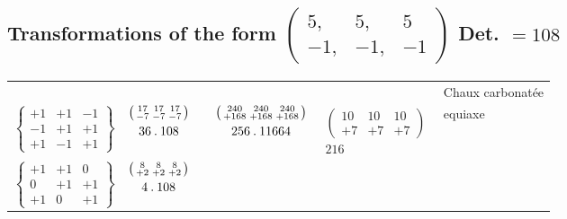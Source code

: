 \subsection*{Transformations of the form $\left(\begin{smallmatrix}5,&5,&5\\-1,&-1,&-1\end{smallmatrix}\right)$ Det. $=108$}
\begin{center}\scriptsize
\setlength{\tabcolsep}{2pt}
\begin{tabular}{ccccc l}
&&&&&Chaux carbonatée\\
$\left\{\begin{smallmatrix}+1&+1&-1\\-1&+1&+1\\+1&-1&+1\end{smallmatrix}\right\}$&
$\begin{gathered}\left(\begin{smallmatrix}17&17&17\\-7&-7&-7\end{smallmatrix}\right)\\36\mathbin{.}108\end{gathered}$&&
$\begin{gathered}\left(\begin{smallmatrix}240&240&240\\+168&+168&+168\end{smallmatrix}\right)\\256\mathbin{.}11664\end{gathered}$&
$\begin{gathered}\left(\begin{smallmatrix}10&10&10\\+7&+7&+7\end{smallmatrix}\right)\\216\end{gathered}$&equiaxe\\[1.4ex]
$\left\{\begin{smallmatrix}+1&+1&0\\0&+1&+1\\+1&0&+1\end{smallmatrix}\right\}$&
$\begin{gathered}\left(\begin{smallmatrix}8&8&8\\+2&+2&+2\end{smallmatrix}\right)\\4\mathbin{.}108\end{gathered}$&

\end{tabular}
\end{center}
